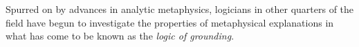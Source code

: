 \documentclass{article}
\newcounter{fncntr}
\newcommand{\fnmark}[1]{\refstepcounter{fncntr}\label{#1}\footnotemark[\getrefnumber{#1}]}
\theoremstyle{definition}
\theoremstyle{definition}
\theoremstyle{definition}
\theoremstyle{definition}
\theoremstyle{remark}
\theoremstyle{definition}
\theoremstyle{definition}
\begin{document}
 Spurred on by advances in analytic metaphysics, logicians in other quarters of the field have begun to investigate the properties of metaphysical explanations in what has come to be known as the \textit{logic of grounding}.

%
%
%
\end{document}
